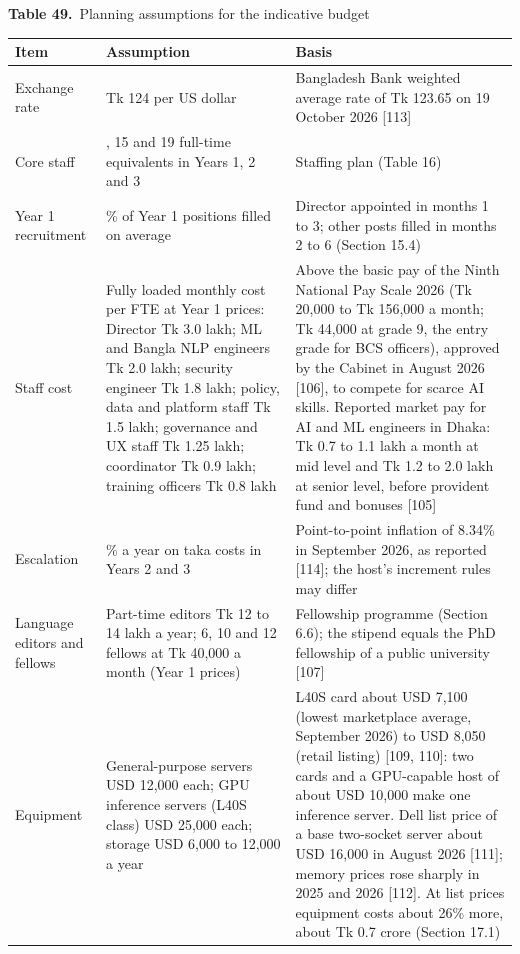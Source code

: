\documentclass[border=10pt]{standalone}
\begin{document}
\begin{minipage}{17cm}
{\large\bfseries Table 49.}\ {\large Planning assumptions for the indicative budget}\par\vspace{7pt}
\small
{}
\begin{tabularx}{\linewidth}{@{}>{\hsize=0.679\hsize\raggedright\arraybackslash}X>{\hsize=1.286\hsize\raggedright\arraybackslash}X>{\hsize=1.036\hsize\raggedright\arraybackslash}X@{}}
\arrayrulecolor{bapilrule}\toprule
\rowcolor{white}\textbf{Item} & \textbf{Assumption} & \textbf{Basis} \\
\midrule
Exchange rate & Tk 124 per US dollar & Bangladesh Bank weighted average rate of Tk 123.65 on 19 October 2026 [113] \\
Core staff & 9, 15 and 19 full-time equivalents in Years 1, 2 and 3 & Staffing plan (Table 16) \\
Year 1 recruitment & 75\% of Year 1 positions filled on average & Director appointed in months 1 to 3; other posts filled in months 2 to 6 (Section 15.4) \\
Staff cost & Fully loaded monthly cost per FTE at Year 1 prices: Director Tk 3.0 lakh; ML and Bangla NLP engineers Tk 2.0 lakh; security engineer Tk 1.8 lakh; policy, data and platform staff Tk 1.5 lakh; governance and UX staff Tk 1.25 lakh; coordinator Tk 0.9 lakh; training officers Tk 0.8 lakh & Above the basic pay of the Ninth National Pay Scale 2026 (Tk 20,000 to Tk 156,000 a month; Tk 44,000 at grade 9, the entry grade for BCS officers), approved by the Cabinet in August 2026 [106], to compete for scarce AI skills. Reported market pay for AI and ML engineers in Dhaka: Tk 0.7 to 1.1 lakh a month at mid level and Tk 1.2 to 2.0 lakh at senior level, before provident fund and bonuses [105] \\
Escalation & 8\% a year on taka costs in Years 2 and 3 & Point-to-point inflation of 8.34\% in September 2026, as reported [114]; the host’s increment rules may differ \\
Language editors and fellows & Part-time editors Tk 12 to 14 lakh a year; 6, 10 and 12 fellows at Tk 40,000 a month (Year 1 prices) & Fellowship programme (Section 6.6); the stipend equals the PhD fellowship of a public university [107] \\
Equipment & General-purpose servers USD 12,000 each; GPU inference servers (L40S class) USD 25,000 each; storage USD 6,000 to 12,000 a year & L40S card about USD 7,100 (lowest marketplace average, September 2026) to USD 8,050 (retail listing) [109, 110]: two cards and a GPU-capable host of about USD 10,000 make one inference server. Dell list price of a base two-socket server about USD 16,000 in August 2026 [111]; memory prices rose sharply in 2025 and 2026 [112]. At list prices equipment costs about 26\% more, about Tk 0.7 crore (Section 17.1) \\

\end{tabularx}
\end{minipage}
\end{document}
